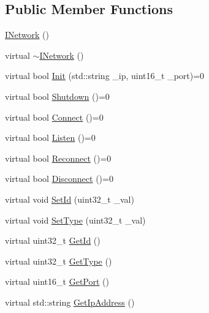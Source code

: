 \subsection*{Public Member Functions}
\begin{DoxyCompactItemize}
\item 
\hyperlink{classINetwork_a6c421d6cd9b2fd2662c21440d7fc275b}{I\+Network} ()
\item 
virtual \hyperlink{classINetwork_a99a59b99873361fe46ef8e97f6cd3866}{$\sim$\+I\+Network} ()
\item 
virtual bool \hyperlink{classINetwork_aff192e3d6708cb1aadef3f6667e02708}{Init} (std\+::string \+\_\+ip, uint16\+\_\+t \+\_\+port)=0
\item 
virtual bool \hyperlink{classINetwork_a6b3892964c456b4b16c8579f8833e93f}{Shutdown} ()=0
\item 
virtual bool \hyperlink{classINetwork_a1b646635942e454f2f2d938bc1fb8685}{Connect} ()=0
\item 
virtual bool \hyperlink{classINetwork_a3f47952a34fec9118c26901783009ac1}{Listen} ()=0
\item 
virtual bool \hyperlink{classINetwork_a3bfb80fcd053977e3674a2da6601f2c1}{Reconnect} ()=0
\item 
virtual bool \hyperlink{classINetwork_a44726fff2e6720f61aa34e4a4ef4780d}{Disconnect} ()=0
\item 
virtual void \hyperlink{classINetwork_a33de9938ac3a014817051b8ee626c5ff}{Set\+Id} (uint32\+\_\+t \+\_\+val)
\item 
virtual void \hyperlink{classINetwork_a1e0be185caf75e5347a2ccbce697f5e0}{Set\+Type} (uint32\+\_\+t \+\_\+val)
\item 
virtual uint32\+\_\+t \hyperlink{classINetwork_a9f2c9f0eae63deff0a01832b61337f0a}{Get\+Id} ()
\item 
virtual uint32\+\_\+t \hyperlink{classINetwork_a61ddaadedc120576b47f8b95ac02f479}{Get\+Type} ()
\item 
virtual uint16\+\_\+t \hyperlink{classINetwork_a85f9906ca9c4c94aa7a0fbe8c385c90d}{Get\+Port} ()
\item 
virtual std\+::string \hyperlink{classINetwork_a6263aaa99202ea1db4c1f939502b8dc0}{Get\+Ip\+Address} ()
\end{DoxyCompactItemize}
